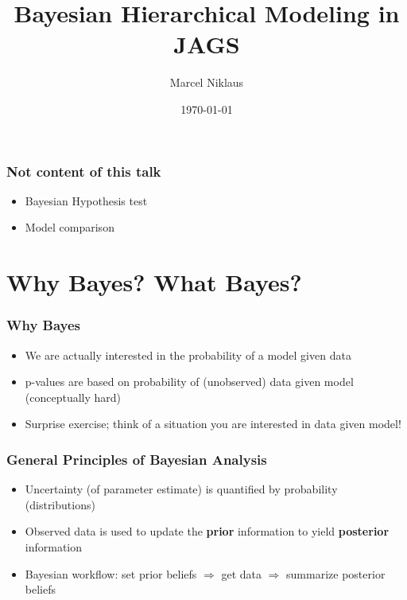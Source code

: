 \documentclass[hyperref={pdfpagelabels=false},unknownkeysallowed]{beamer}
\title{Bayesian Hierarchical Modeling in JAGS}
\author{Marcel Niklaus}
\date{\today}
\begin{document}
	
\begin{frame}
\titlepage
\end{frame} 



\begin{frame}
	\frametitle{Not content of this talk}
	\begin{itemize}
	\item Bayesian Hypothesis test
	\item Model comparison
	\end{itemize} 
	\note{}
\end{frame}

\section{Why Bayes? What Bayes?}
\begin{frame}
	\frametitle{Why Bayes}
	\begin{itemize}
	\item We are actually interested in the probability of a model given data
	\item p-values are based on probability of (unobserved) data given model (conceptually hard) 
	\pause
		\item Surprise exercise; think of a situation you are interested in data given model! 
	\end{itemize} 
\end{frame}


\begin{frame}
\frametitle{General Principles of Bayesian Analysis}
\begin{itemize}
	\item Uncertainty (of parameter estimate) is quantified by probability (distributions)
	\item Observed data is used to update the \textbf{prior} information to yield  \textbf{posterior} information
	\item Bayesian workflow: set prior beliefs $\Rightarrow$ get data $\Rightarrow$ summarize posterior beliefs

\end{itemize} 
\note{}
\end{frame}
\end{document}
